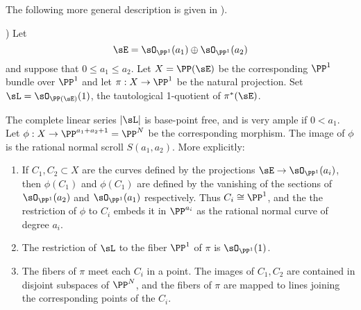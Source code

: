 The following  more general description is  given in  \cite[Proposition V.2.2]{Hartshorne1977}).

%
%
%

\begin{theorem} \cite[Proposition V.2.3]{Hartshorne1977})
Let 
$$
\sE = \sO_{\PP^1}(a_1) \oplus \sO_{\PP^1}(a_2)
$$
and suppose that $0\leq a_1\leq a_2$. Let $X = \PP(\sE)$  be the corresponding $\PP^1$ bundle over $\PP^1$
and let $\pi: X \to \PP^1$ be the natural projection. Set $\sL =   \sO_{\PP(\sE)}(1)$, the tautological 1-quotient of $\pi^*(\sE)$.

The complete linear series $|\sL|$ is base-point free, and is very ample if $0<a_1$. 
Let $\phi:X\to \PP^{a_1+a_2+1} = \PP^N$ be the corresponding morphism. The image of $\phi$ is the rational normal scroll $S(a_1,a_2).$
More explicitly:
\begin{enumerate}
 \item If $C_1, C_2\subset X$ are the curves defined by the projections $\sE \to \sO_{\PP^1}(a_i)$, then $\phi(C_1)$ and $\phi(C_1)$
 are defined by the vanishing
of the sections of $\sO_{\PP^1}(a_2)$ and  $\sO_{\PP^1}(a_1)$ respectively. Thus $C_i \cong \PP^1$,
and the the restriction of $\phi$ to $C_i$ embeds it in $\PP^{a_i}$ as the rational normal curve of degree $a_i$.

\item The restriction of $\sL$ to the fiber $\PP^1$ of $\pi$ is $\sO_{\PP^1}(1)$.

\item The fibers of $\pi$ meet each $C_i$ in a point. The images of $C_1, C_2$ are contained in disjoint subspaces of $\PP^N$, and the fibers of $\pi$ are mapped 
to lines joining the corresponding points of the $C_i$.
\end{enumerate}
\end{theorem}


